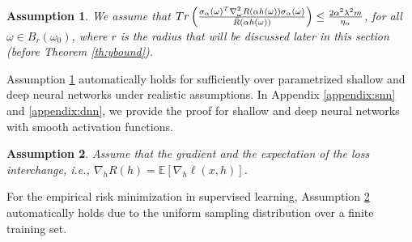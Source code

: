 \documentclass[10pt]{article} %
\newtheorem{assumption}{Assumption}
\begin{document}
\begin{assumption}\label{assumption:combined}
We assume that $Tr\left(\frac{\sigma_\alpha(\omega)^T\nabla_\omega^2R(\alpha h(\omega))\sigma_\alpha(\omega)}{\Bar{R}(\alpha h(\omega))}\right)\leq \frac{2\alpha^2\lambda^2m}{\eta_\alpha}$, for all $\omega \in B_{r}(\omega_0)$, where $r$ is the radius that will be discussed later in this section (before Theorem \ref{th:ybound}).
\end{assumption}
Assumption \ref{assumption:combined} automatically holds for sufficiently over parametrized shallow and deep neural networks under realistic assumptions. In Appendix \ref{appendix:snn} and \ref{appendix:dnn}, we provide the proof for shallow and deep neural networks with smooth activation functions.

\begin{assumption}\label{assumption:interchangeability}
    Assume that the gradient and the expectation of the loss interchange, i.e., $\nabla_h R(h) = \mathbb{E}[\nabla_h \ell(x, h)]$.
\end{assumption}
For the empirical risk minimization in supervised learning, Assumption \ref{assumption:interchangeability} automatically holds due to the uniform sampling distribution over a finite training set.
\end{document}
